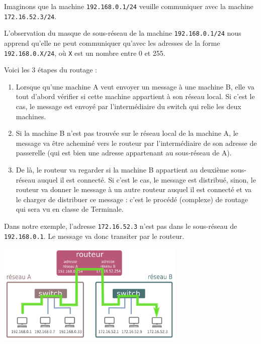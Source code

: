\documentclass[a4paper,dvipsnames]{article}
\begin{document}
\begin{proposition}[breakable, title=Principe de fonctionnement d'un routeur]{}{}
  Imaginons que la machine \texttt{192.168.0.1/24} veuille communiquer avec la machine \texttt{172.16.52.3/24}.

  \smallskip

  L'observation du masque de sous-réseau de la machine \texttt{192.168.0.1/24} nous apprend qu'elle ne peut communiquer qu'avec les adresses de la forme \texttt{192.168.0.X/24}, où \texttt{X} est un nombre entre 0 et 255.

  \tcblower

  Voici les 3 étapes du routage :

  \begin{enumerate}
    \item Lorsque qu'une machine A veut envoyer un message à une machine B, elle va tout d'abord vérifier si cette machine appartient à son réseau local. Si c'est le cas, le message est envoyé par l'intermédiaire du switch qui relie les deux machines.
    \item Si la machine B n'est pas trouvée sur le réseau local de la machine A, le message va être acheminé vers le routeur par l'intermédiaire de son adresse de passerelle (qui est bien une adresse appartenant au sous-réseau de A).
    \item De là, le routeur va regarder si la machine B appartient au deuxième sous-réseau auquel il est connecté. Si c'est le cas, le message est distribué, sinon, le routeur va donner le message à un autre routeur auquel il est connecté et va le charger de distribuer ce message : c'est le procédé (complexe) de routage qui sera vu en classe de Terminale.
  \end{enumerate}

  Dans notre exemple, l'adresse \texttt{172.16.52.3} n'est pas dans le sous-réseau de \texttt{192.168.0.1}. Le message va donc transiter par le routeur.

  \begin{center}
    \includegraphics[width=9cm]{img/routeur2.png}
  \end{center}
\end{proposition}
\end{document}
